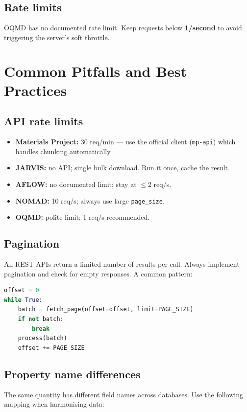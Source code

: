 \documentclass[11pt,a4paper]{article}
\begin{document}
\subsection{Rate limits}
OQMD has no documented rate limit. Keep requests below \textbf{1/second} to avoid
triggering the server's soft throttle.

\section{Common Pitfalls and Best Practices}

\subsection{API rate limits}
\begin{itemize}
  \item \textbf{Materials Project:} 30 req/min --- use the official client
        (\texttt{mp-api}) which handles chunking automatically.
  \item \textbf{JARVIS:} no API; single bulk download. Run it once, cache the result.
  \item \textbf{AFLOW:} no documented limit; stay at $\leq$2 req/s.
  \item \textbf{NOMAD:} 10 req/s; always use large \texttt{page\_size}.
  \item \textbf{OQMD:} polite limit; 1 req/s recommended.
\end{itemize}

\subsection{Pagination}
All REST APIs return a limited number of results per call.
Always implement pagination and check for empty responses.
A common pattern:
\begin{lstlisting}[language=Python]
offset = 0
while True:
    batch = fetch_page(offset=offset, limit=PAGE_SIZE)
    if not batch:
        break
    process(batch)
    offset += PAGE_SIZE
\end{lstlisting}

\subsection{Property name differences}
The same quantity has different field names across databases.
Use the following mapping when harmonising data:
\end{document}
